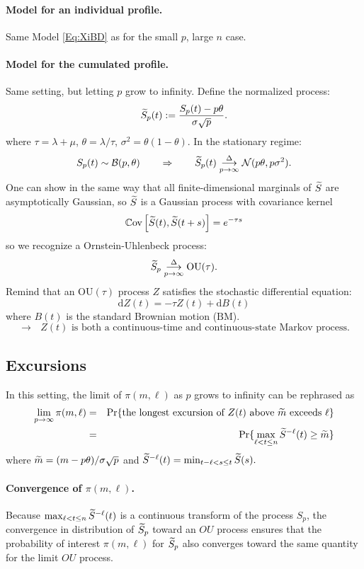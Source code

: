 \documentclass[a4paper,12pt]{article}
\newcommand{\Bcal}{\mathcal{B}}
\newcommand{\BM}{\text{BM}}
\newcommand{\Cov}{\mathbb{C}\text{ov}}
\newcommand{\dd}{\text{d}}
\newcommand{\Ncal}{\mathcal{N}}
\newcommand{\OU}{\text{OU}}
\newcommand{\ra}{$\rightarrow$ \xspace}
\begin{document}
\paragraph{Model for an individual profile.} Same Model \eqref{Eq:XiBD} as for the small $p$, large $n$ case.

\paragraph{Model for the cumulated profile.} Same setting, but letting $p$ grow to infinity. Define the normalized process:
$$
\widetilde{S}_p(t) := \frac{S_p(t) - p \theta}{\sigma \sqrt{p}}. 
$$
where $\tau = \lambda + \mu$, $\theta = \lambda/\tau$, $\sigma^2 = \theta(1-\theta)$. In the stationary regime:
$$
S_p(t) \sim \Bcal(p, \theta) 
\qquad \Rightarrow \qquad 
\St_p(t) \underset{p \rightarrow \infty}{\overset{\Delta}{\longrightarrow}} \Ncal(p \theta, p \sigma^2).
$$
One can show in the same way that all finite-dimensional marginals of $\widetilde{S}$ are asymptotically Gaussian, so $\widetilde{S}$ is a Gaussian process with covariance kernel
$$
\Cov\left[\St(t), \St(t+s)\right] = e^{-\tau s}
$$
so we recognize a Ornstein-Uhlenbeck process:
$$
\St_p \underset{p \rightarrow \infty}{\overset{\Delta}{\longrightarrow}} \OU(\tau).
$$
Remind that an $\OU(\tau)$ process $Z$ satisfies the stochastic differential equation:
$$
\dd Z(t) = - \tau Z(t) + \dd B(t)
$$
where $B(t)$ is the standard Brownian motion ($\BM$). 
$$
\text{\ra $Z(t)$ is both a continuous-time and continuous-state Markov process.}
$$

\subsection{Excursions}

In this setting, the limit of $\pi(m, \ell)$ as $p$ grows to infinity can be rephrased as
\begin{eqnarray*}
\lim_{p \rightarrow \infty} \pi(m, \ell) 
& = & \Pr\{\text{the longest excursion of $Z(t)$ above $\widetilde{m}$ exceeds $\ell$}\} \\
& = & \Pr\{\max_{\ell < t \leq n} \widetilde{S}^{-\ell}(t) \geq \widetilde{m}\}
\end{eqnarray*}
where $\widetilde{m} = (m - p \theta)/\sigma \sqrt{p}$ and $\widetilde{S}^{-\ell}(t) = \min_{t-\ell < s \leq t} \widetilde{S}(s).$

\paragraph{Convergence of $\pi(m,  \ell)$.} Because $\max_{\ell < t \leq n} \widetilde{S}^{-\ell}(t)$ is a continuous transform of the process $S_p$, the convergence in distribution of $\widetilde{S}_p$ toward an $OU$ process ensures that the probability of interest $\pi(m, \ell)$ for $\widetilde{S}_p$ also converges toward the same quantity for the limit $OU$ process.
\end{document}
